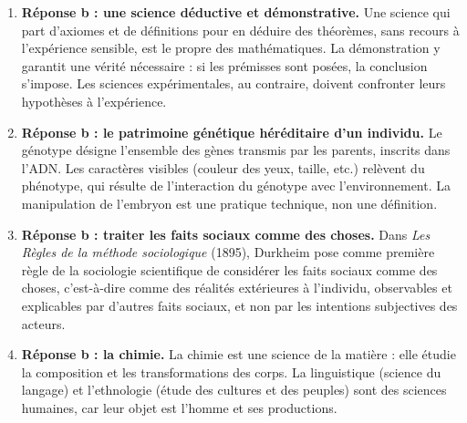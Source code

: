 \documentclass[11pt]{article}
\begin{document}
\begin{corrige}
\begin{enumerate}
\item \textbf{Réponse b : une science déductive et démonstrative.} Une science qui part d'axiomes et de définitions pour en déduire des théorèmes, sans recours à l'expérience sensible, est le propre des mathématiques. La démonstration y garantit une vérité nécessaire : si les prémisses sont posées, la conclusion s'impose. Les sciences expérimentales, au contraire, doivent confronter leurs hypothèses à l'expérience.
\item \textbf{Réponse b : le patrimoine génétique héréditaire d'un individu.} Le génotype désigne l'ensemble des gènes transmis par les parents, inscrits dans l'ADN. Les caractères visibles (couleur des yeux, taille, etc.) relèvent du phénotype, qui résulte de l'interaction du génotype avec l'environnement. La manipulation de l'embryon est une pratique technique, non une définition.
\item \textbf{Réponse b : traiter les faits sociaux comme des choses.} Dans \emph{Les Règles de la méthode sociologique} (1895), Durkheim pose comme première règle de la sociologie scientifique de considérer les faits sociaux comme des choses, c'est-à-dire comme des réalités extérieures à l'individu, observables et explicables par d'autres faits sociaux, et non par les intentions subjectives des acteurs.
\item \textbf{Réponse b : la chimie.} La chimie est une science de la matière : elle étudie la composition et les transformations des corps. La linguistique (science du langage) et l'ethnologie (étude des cultures et des peuples) sont des sciences humaines, car leur objet est l'homme et ses productions.
\end{enumerate}
\end{corrige}
\end{document}

